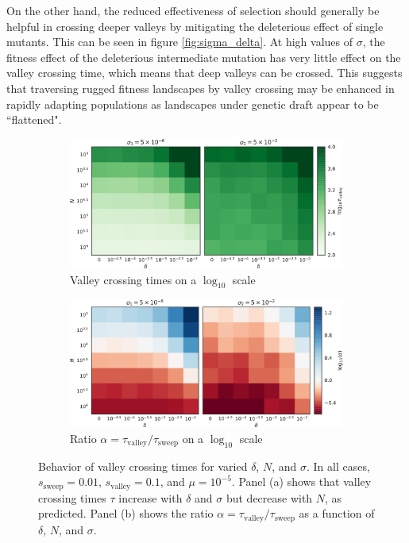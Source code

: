 \documentclass[10pt,twocolumn,twoside]{gsajnl}
\begin{document}
\begin{spacing}{1.5}
On the other hand, the reduced effectiveness of selection should generally be helpful in crossing deeper valleys by mitigating the deleterious effect of single mutants.
This can be seen in figure \ref{fig:sigma_delta}.
At high values of $\sigma$, the fitness effect of the deleterious intermediate mutation has very little effect on the valley crossing time, which means that deep valleys can be crossed.
This suggests that traversing rugged fitness landscapes by valley crossing may be enhanced in rapidly adapting populations as landscapes under genetic draft appear to be ``flattened".

\begin{figure}[t]
\begin{subfigure}[b]{0.475\textwidth}
  \includegraphics[width=\textwidth]{Figures/tau_compare_crop.pdf}
  \caption{Valley crossing times on a $\log_{10}$ scale}
  \label{fig:tau}
\end{subfigure}
\begin{subfigure}[b]{0.475\textwidth}
  \includegraphics[width=\textwidth]{Figures/alpha_ratios_crop.pdf}
  \caption{Ratio $\alpha = \tau_{\mathrm{valley}}/\tau_{\mathrm{sweep}}$ on a $\log_{10}$ scale}
  \label{fig:ratios}
\end{subfigure}
\caption{Behavior of valley crossing times for varied $\delta$, $N$, and $\sigma$. In all cases, $s_{\mathrm{sweep}} = 0.01$, $s_{\mathrm{valley}} = 0.1$, and $\mu = 10^{-5}$. Panel (a) shows that valley crossing times $\tau$ increase with $\delta$ and $\sigma$ but decrease with $N$, as predicted. Panel (b) shows the ratio $\alpha = \tau_{\mathrm{valley}}/\tau_{\mathrm{sweep}}$ as a function of $\delta$, $N$, and $\sigma$.}
\label{fig:tau-ratios}
\end{figure}


\end{spacing}
\end{document}
